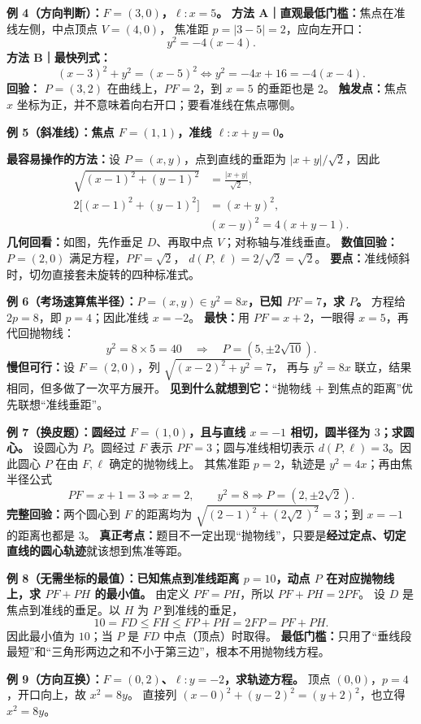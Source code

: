 \begin{examplebox}
\textbf{例 4（方向判断）：$F=(3,0)$，$\ell:x=5$。}
\textbf{方法 A｜直观最低门槛：}焦点在准线左侧，中点顶点 $V=(4,0)$，
焦准距 $p=|3-5|=2$，应向左开口：
\[\boxed{y^2=-4(x-4)}.\]
\textbf{方法 B｜最快列式：}
\[
(x-3)^2+y^2=(x-5)^2
\iff y^2=-4x+16=-4(x-4).
\]
\textbf{回验：} $P=(3,2)$ 在曲线上，$PF=2$，到 $x=5$ 的垂距也是 $2$。
\textbf{触发点：}焦点 $x$ 坐标为正，并不意味着向右开口；要看准线在焦点哪侧。
\end{examplebox}
\clearpage
\begin{examplebox}
\textbf{例 5（斜准线）：焦点 $F=(1,1)$，准线 $\ell:x+y=0$。}

\textbf{最容易操作的方法：}设 $P=(x,y)$，点到直线的垂距为 $|x+y|/\sqrt2$，因此
\[
\begin{aligned}
\sqrt{(x-1)^2+(y-1)^2}&=\frac{|x+y|}{\sqrt2},\\
2\bigl[(x-1)^2+(y-1)^2\bigr]&=(x+y)^2,\\
&\boxed{(x-y)^2=4(x+y-1)}.
\end{aligned}
\]
\textbf{几何回看：}如图，先作垂足 $D$、再取中点 $V$；对称轴与准线垂直。
\textbf{数值回验：} $P=(2,0)$ 满足方程，$PF=\sqrt2$，
$d(P,\ell)=2/\sqrt2=\sqrt2$。
\textbf{要点：}准线倾斜时，切勿直接套未旋转的四种标准式。
\end{examplebox}
\clearpage
\begin{examplebox}
\textbf{例 6（考场速算焦半径）：$P=(x,y)\in y^2=8x$，已知 $PF=7$，求 $P$。}
方程给 $2p=8$，即 $p=4$；因此准线 $x=-2$。
\textbf{最快：}用 $PF=x+2$，一眼得 $x=5$，再代回抛物线：
\[
y^2=8\times5=40\quad\Longrightarrow\quad
\boxed{P=(5,\pm2\sqrt{10})}.
\]
\textbf{慢但可行：}设 $F=(2,0)$，列 $\sqrt{(x-2)^2+y^2}=7$，
再与 $y^2=8x$ 联立，结果相同，但多做了一次平方展开。
\textbf{见到什么就想到它：}“抛物线 + 到焦点的距离”优先联想“准线垂距”。
\end{examplebox}
\clearpage
\begin{examplebox}
\textbf{例 7（换皮题）：圆经过 $F=(1,0)$，且与直线 $x=-1$ 相切，圆半径为 $3$；求圆心。}
设圆心为 $P$。圆经过 $F$ 表示 $PF=3$；圆与准线相切表示
$d(P,\ell)=3$。因此圆心 $P$ 在由 $F,\ell$ 确定的抛物线上。
其焦准距 $p=2$，轨迹是 $y^2=4x$；再由焦半径公式
\[
PF=x+1=3\Longrightarrow x=2,
\qquad y^2=8\Longrightarrow
\boxed{P=(2,\pm2\sqrt2)}.
\]
\textbf{完整回验：}两个圆心到 $F$ 的距离均为
$\sqrt{(2-1)^2+(2\sqrt2)^2}=3$；到 $x=-1$ 的距离也都是 $3$。
\textbf{真正考点：}题目不一定出现“抛物线”，只要是\textbf{经过定点、切定直线的圆心轨迹}就该想到焦准等距。
\end{examplebox}
\clearpage
\begin{examplebox}
\textbf{例 8（无需坐标的最值）：已知焦点到准线距离 $p=10$，动点 $P$ 在对应抛物线上，求 $PF+PH$ 的最小值。}
由定义 $PF=PH$，所以 $PF+PH=2PF$。
设 $D$ 是焦点到准线的垂足。以 $H$ 为 $P$ 到准线的垂足，
\[
10=FD\le FH\le FP+PH=2FP=PF+PH.
\]
因此最小值为 $\boxed{10}$；当 $P$ 是 $FD$ 中点（顶点）时取得。
\textbf{最低门槛：}只用了“垂线段最短”和“三角形两边之和不小于第三边”，根本不用抛物线方程。

\medskip
\textbf{例 9（方向互换）：$F=(0,2)$、$\ell:y=-2$，求轨迹方程。}
顶点 $(0,0)$，$p=4$，开口向上，故 $\boxed{x^2=8y}$。
直接列 $(x-0)^2+(y-2)^2=(y+2)^2$，也立得 $x^2=8y$。
\end{examplebox}
